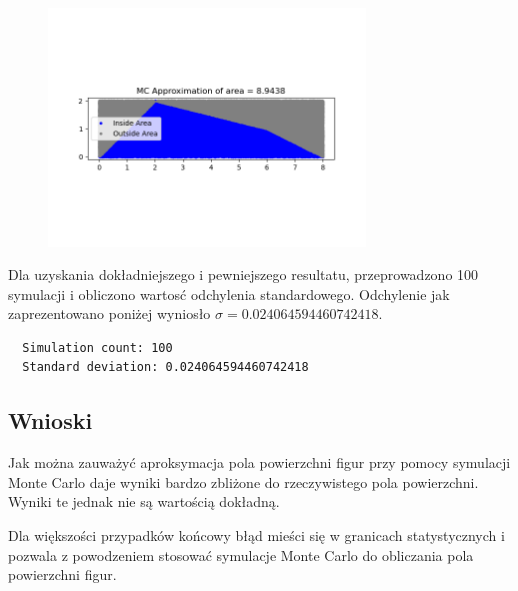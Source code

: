 \documentclass[12pt,oneside,a4paper]{book} %
\theoremstyle{break}
\begin{document}
\begin{figure}[H]
  \centering
  \includegraphics[width=0.75\textwidth]{area_aproximation_single_run.png}
\end{figure}

Dla uzyskania dokładniejszego i pewniejszego resultatu, przeprowadzono 100 symulacji i obliczono wartosć odchylenia standardowego. Odchylenie jak zaprezentowano poniżej wyniosło $\sigma = 0.024064594460742418$.

\begin{verbatim}
  Simulation count: 100
  Standard deviation: 0.024064594460742418
\end{verbatim}

\subsection*{Wnioski}

Jak można zauważyć aproksymacja pola powierzchni figur przy pomocy symulacji Monte Carlo daje wyniki bardzo zbliżone do rzeczywistego pola powierzchni. Wyniki te jednak nie są wartością dokładną.

Dla większości przypadków końcowy błąd mieści się w granicach statystycznych i pozwala z powodzeniem stosować symulacje Monte Carlo do obliczania pola powierzchni figur.
\end{document}
